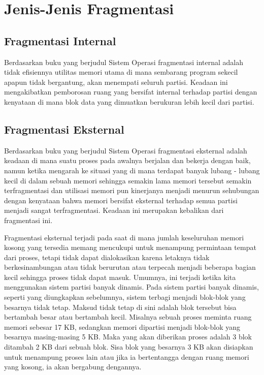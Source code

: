 ﻿%

\section{Jenis-Jenis Fragmentasi}
\subsection{Fragmentasi Internal}
Berdasarkan buku yang berjudul Sistem Operasi \cite{pangera2005sistem} fragmentasi internal adalah tidak efisiennya utilitas memori utama di mana sembarang program sekecil apapun tidak bergantung, akan menempati seluruh partisi. Keadaan ini mengakibatkan pemborosan ruang yang bersifat internal terhadap partisi dengan kenyataan di 
mana blok data yang dimuatkan berukuran lebih kecil dari partisi.


\subsection{Fragmentasi Eksternal}
Berdasarkan buku yang berjudul Sistem Operasi \cite{pangera2005sistem} fragmentasi eksternal adalah keadaan di mana suatu proses pada awalnya berjalan dan bekerja dengan baik, namun ketika mengarah ke situasi yang di mana terdapat banyak lubang - lubang kecil di dalam sebuah memori sehingga semakin lama memori tersebut semakin terfragmentasi dan utilisasi memori pun kinerjanya menjadi menurun sehubungan dengan kenyataan bahwa memori bersifat eksternal terhadap semua partisi menjadi sangat terfragmentasi. Keadaan ini merupakan kebalikan dari fragmentasi ini.

Fragmentasi eksternal terjadi pada saat di mana jumlah keseluruhan memori kosong yang tersedia memang mencukupi untuk menampung permintaan tempat dari proses, tetapi tidak dapat dialokasikan karena letaknya tidak berkesinambungan atau tidak berurutan atau terpecah menjadi beberapa bagian kecil sehingga proses tidak dapat masuk. 
Umumnya, ini terjadi ketika kita menggunakan sistem partisi banyak dinamis. Pada sistem partisi banyak dinamis, seperti yang diungkapkan sebelumnya, sistem terbagi menjadi blok-blok yang besarnya tidak tetap.
Maksud tidak tetap di sini adalah blok tersebut bisa bertambah besar atau bertambah kecil. 
Misalnya sebuah proses meminta ruang memori sebesar 17 KB, sedangkan memori dipartisi menjadi blok-blok yang besarnya masing-masing 5 KB. Maka yang akan diberikan proses adalah 3 blok ditambah 2 KB dari sebuah blok. Sisa blok yang besarnya 3 KB akan disiapkan untuk menampung proses lain atau jika ia bertentangga dengan ruang memori yang kosong, ia akan bergabung dengannya.


